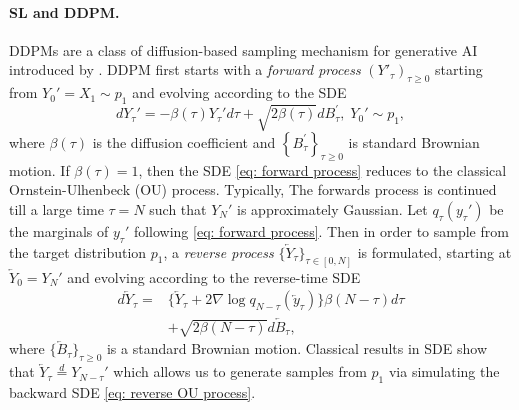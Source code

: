 \documentclass{article}
\theoremstyle{plain}
\theoremstyle{definition}
\theoremstyle{remark}
\newcommand{\bc}[1]{\left\{{#1}\right\}}
\begin{document}
\paragraph{SL and DDPM.}
DDPMs are a class of diffusion-based sampling mechanism for generative AI introduced by \citet{ho2020denoising}.  DDPM first starts with a \textit{forward process} $(Y'_\tau)_{\tau\ge 0}$ starting from $Y_0' = X_1 \sim p_1$ and  evolving according to the SDE
\begin{equation}
    \label{eq: forward process}
    dY_\tau' = - \beta(\tau) Y_\tau' d\tau + \sqrt{2 \beta(\tau)} dB^\prime_\tau, \; Y_0' \sim p_1,
\end{equation}
where $\beta(\tau)$ is the diffusion coefficient and $\bc{B^\prime_\tau}_{\tau\ge 0}$ is standard Brownian motion. If $\beta(\tau) = 1$, then the SDE \eqref{eq: forward process} reduces to the classical Ornstein-Ulhenbeck (OU) process.
Typically, The forwards process is continued till a large time $\tau = N$ such that $Y_N'$ is approximately Gaussian. Let $q_\tau(y_\tau')$ be the marginals of $y_\tau'$ following \eqref{eq: forward process}. Then in order to sample from the target distribution $p_1$, a \emph{reverse process} $\{\overleftarrow Y_\tau\}_{\tau \in [0,N]} $ is formulated, starting at $\overleftarrow Y_0 = Y_N'$ and evolving according to the reverse-time SDE  
\begin{equation}
\label{eq: reverse OU process}
\begin{aligned}
  d\overleftarrow Y_{\tau} =  & \{\overleftarrow Y_\tau + 2 \nabla \log q_{N - \tau}(\overleftarrow y_\tau)\} \beta(N-\tau)d\tau\\
  & + \sqrt{2 \beta(N-\tau)} d \overleftarrow B_\tau,
  \end{aligned}
\end{equation}
where $\{\overleftarrow B_\tau\}_{\tau \ge 0}$ is a standard Brownian motion.
Classical results in SDE \cite{anderson1982reverse, haussmann1986time} show that $\overleftarrow Y_\tau \overset{d}{=} Y_{N - \tau}'$ which allows us to generate samples from $p_1$ via simulating the backward SDE \eqref{eq: reverse OU process}.
\end{document}
